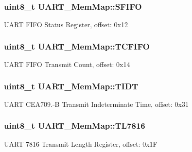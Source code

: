 \subsubsection[{S\+F\+I\+F\+O}]{\setlength{\rightskip}{0pt plus 5cm}uint8\+\_\+t U\+A\+R\+T\+\_\+\+Mem\+Map\+::\+S\+F\+I\+F\+O}\label{struct_u_a_r_t___mem_map_a5c2f7031c23749513028d0f35f833756}
U\+A\+R\+T F\+I\+F\+O Status Register, offset\+: 0x12 \hypertarget{struct_u_a_r_t___mem_map_a46f296d6f9aead85a8aa286f9ed21ec6}{}
\subsubsection[{T\+C\+F\+I\+F\+O}]{\setlength{\rightskip}{0pt plus 5cm}uint8\+\_\+t U\+A\+R\+T\+\_\+\+Mem\+Map\+::\+T\+C\+F\+I\+F\+O}\label{struct_u_a_r_t___mem_map_a46f296d6f9aead85a8aa286f9ed21ec6}
U\+A\+R\+T F\+I\+F\+O Transmit Count, offset\+: 0x14 \hypertarget{struct_u_a_r_t___mem_map_a26263655b9382b2ecd3d86954b36aaed}{}
\subsubsection[{T\+I\+D\+T}]{\setlength{\rightskip}{0pt plus 5cm}uint8\+\_\+t U\+A\+R\+T\+\_\+\+Mem\+Map\+::\+T\+I\+D\+T}\label{struct_u_a_r_t___mem_map_a26263655b9382b2ecd3d86954b36aaed}
U\+A\+R\+T C\+E\+A709.-\/\+B Transmit Indeterminate Time, offset\+: 0x31 \hypertarget{struct_u_a_r_t___mem_map_ab93bfbd2b99631b8f3c8ca6c8e482310}{}
\subsubsection[{T\+L7816}]{\setlength{\rightskip}{0pt plus 5cm}uint8\+\_\+t U\+A\+R\+T\+\_\+\+Mem\+Map\+::\+T\+L7816}\label{struct_u_a_r_t___mem_map_ab93bfbd2b99631b8f3c8ca6c8e482310}
U\+A\+R\+T 7816 Transmit Length Register, offset\+: 0x1\+F \hypertarget{struct_u_a_r_t___mem_map_aaef0682db07857a89bbc31b6436126cd}{}
